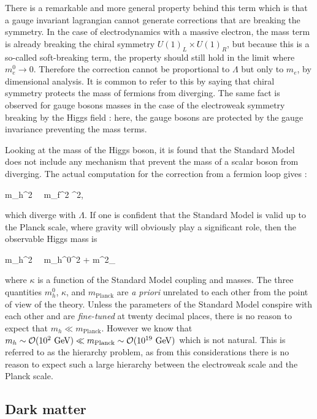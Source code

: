     There is a remarkable and more general property behind this term which is that a
    gauge invariant lagrangian cannot generate corrections that are breaking the symmetry. In
    the case of electrodynamics with a massive electron, the mass term is already breaking
    the chiral symmetry $U(1)_L \times U(1)_R$, but because this is a so-called soft-breaking
    term, the property should still hold in the limit where $m_e^0 \rightarrow 0$.
    Therefore the correction cannot be proportional to $\Lambda$ but only to $m_e$, by
    dimensional analysis. It is common to refer to this by saying that chiral symmetry
    protects the mass of fermions from diverging. The same fact is observed for gauge
    bosons masses in the case of the electroweak symmetry breaking by the Higgs field :
    here, the gauge bosons are protected by the gauge invariance preventing the mass terms.

    Looking at the mass of the Higgs boson, it is found that the Standard Model does not include
    any mechanism that prevent the mass of a scalar boson from diverging. The actual
    computation for the correction from a fermion loop gives :

    {
        \Delta m_h^2 \, \propto \, m_f^2 \Lambda^2,
    }

    which diverge with $\Lambda$. If one is confident that the Standard Model is valid
    up to the Planck scale, where gravity will obviously play a significant role, then
    the observable Higgs mass is

    {
        m_h^2 \, \simeq \, {m_h^0}^2 + \kappa \cdot m^2_
    }

    where $\kappa$ is a function of the Standard Model coupling and masses. The
    three quantities $m_h^0$, $\kappa$, and $m_\text{Planck}$ are \emph{a priori} unrelated
    to each other from the point of view of the theory. Unless the parameters of the
    Standard Model conspire with each other and are \emph{fine-tuned} at twenty decimal
    places, there is no reason to expect that $m_h \ll m_\text{Planck}$. However we know
    that $m_h \sim \mathcal{O}(10^2~\text{GeV}) \ll m_\text{Planck} \sim \mathcal{O}(10^{19}~\text{GeV})$ which
    is not natural. This is referred to as the hierarchy problem, as from this considerations
    there is no reason to expect such a large hierarchy between the electroweak scale and
    the Planck scale.

        \subsection{Dark matter}


